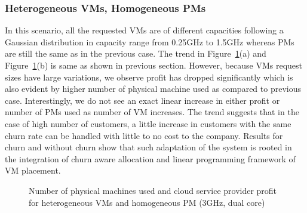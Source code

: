 \subsubsection{Heterogeneous VMs, Homogeneous PMs}
In this scenario, all the requested VMs are of different capacities following a Gaussian distribution in capacity range from 0.25GHz to 1.5GHz whereas PMs are still the same as in the previous case. The trend in Figure~\ref{result2}(a) and Figure~\ref{result2}(b) is same as shown in previous section. However, because VMs request sizes have large variations, we observe profit has dropped significantly which is also evident by higher number of physical machine used as compared to previous case. Interestingly, we do not see an exact linear increase in either profit or number of PMs used as number of VM increases. The trend suggests that in the case of high number of customers, a little increase in customers with the same churn rate can be handled with little to no cost to the company. Results for churn and without churn show that such adaptation of the system is rooted in the integration of churn aware allocation and linear programming framework of VM placement. 

\begin{figure} [!htp]
  \centering
   \quad
  \caption{ Number of physical machines used and cloud service provider profit for heterogeneous VMs and homogeneous PM (3GHz, dual core)  }
  \label{result2}
\end{figure}


